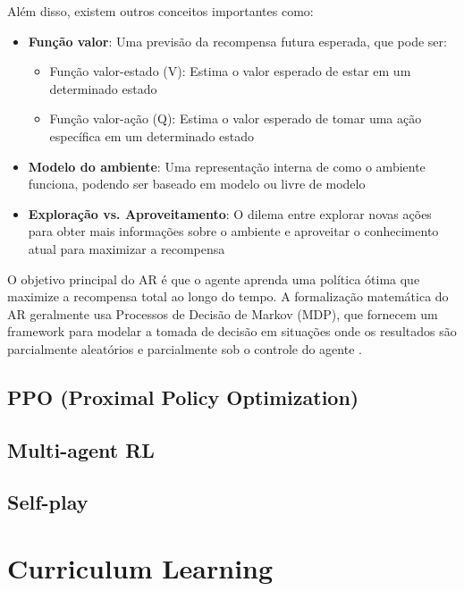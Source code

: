 Além disso, existem outros conceitos importantes como:

\begin{itemize}
    \item \textbf{Função valor}: Uma previsão da recompensa futura esperada, que pode ser:
    \begin{itemize}
        \item Função valor-estado (V): Estima o valor esperado de estar em um determinado estado
        \item Função valor-ação (Q): Estima o valor esperado de tomar uma ação específica em um determinado estado
    \end{itemize}
    
    \item \textbf{Modelo do ambiente}: Uma representação interna de como o ambiente funciona, podendo ser baseado em modelo ou livre de modelo
    
    \item \textbf{Exploração vs. Aproveitamento}: O dilema entre explorar novas ações para obter mais informações sobre o ambiente e aproveitar o conhecimento atual para maximizar a recompensa
\end{itemize}

O objetivo principal do AR é que o agente aprenda uma política ótima que maximize a recompensa total ao longo do tempo. A formalização matemática do AR geralmente usa Processos de Decisão de Markov (MDP), que fornecem um framework para modelar a tomada de decisão em situações onde os resultados são parcialmente aleatórios e parcialmente sob o controle do agente \cite{mcmc}.

\subsection{PPO (Proximal Policy Optimization)}
\label{subsec:ppo}

\subsection{Multi-agent RL}
\label{subsec:marl}

\subsection{Self-play}
\label{subsec:self_play}

\section{Curriculum Learning}
\label{sec:curriculum}

